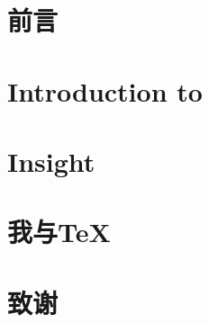 \documentclass[lang=cn]{ZLaTeX}
\begin{document}
\contents[.8]
\clearpage


\chapter{前言}



\chapter{Introduction to \zlatex}












\chapter{\zlatex{} Insight}




\chapter{我与\TeX{}}



\chapter{致谢}

\end{document}
